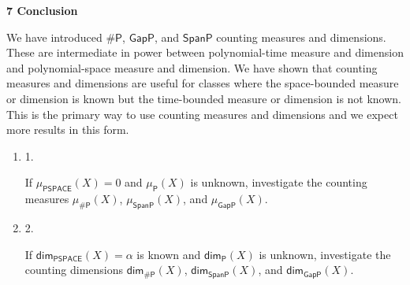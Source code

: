 \par\medskip\noindent\textbf{
7 Conclusion}\par




We have introduced ${\mathsf{\#}\mathsf{P}}$, $\mathsf{GapP}$, and
$\mathsf{SpanP}$ counting measures and dimensions. These are intermediate in power between polynomial-time measure and dimension and polynomial-space measure and dimension. We have shown that counting measures and dimensions are useful for classes where the space-bounded measure or dimension is known but the time-bounded measure or dimension is not known.
This is the primary way to use counting measures and dimensions and we expect more results in this form.\par


\begin{enumerate}


\item[] 
1. 


If $\mu_{\mathsf{PSPACE}}(X)=0$ and $\mu_{\mathsf{P}}(X)$ is unknown, investigate the counting measures $\mu_{{\mathsf{\#}\mathsf{P}}}(X)$, $\mu_{\mathsf{SpanP}}(X)$, and $\mu_{\mathsf{GapP}}(X)$.\par





\item[] 
2. 


If ${\mathsf{dim}}_{\mathsf{PSPACE}}(X)=\alpha$ is known and ${\mathsf{dim}}_{\mathsf{P}}(X)$ is unknown, investigate the counting dimensions ${\mathsf{dim}}_{{\mathsf{\#}\mathsf{P}}}(X)$, ${\mathsf{dim}}_{\mathsf{SpanP}}(X)$, and ${\mathsf{dim}}_{\mathsf{GapP}}(X)$.\par





\end{enumerate}




